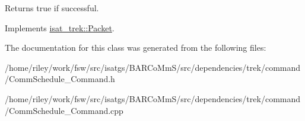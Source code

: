 \begin{DoxyReturn}{Returns}
true if successful. 
\end{DoxyReturn}


Implements \hyperlink{classisat__trek_1_1_packet}{isat\+\_\+trek\+::\+Packet}.



The documentation for this class was generated from the following files\+:\begin{DoxyCompactItemize}
\item 
/home/riley/work/fsw/src/isatgs/\+B\+A\+R\+Co\+Mm\+S/src/dependencies/trek/command/Comm\+Schedule\+\_\+\+Command.\+h\item 
/home/riley/work/fsw/src/isatgs/\+B\+A\+R\+Co\+Mm\+S/src/dependencies/trek/command/Comm\+Schedule\+\_\+\+Command.\+cpp\end{DoxyCompactItemize}
